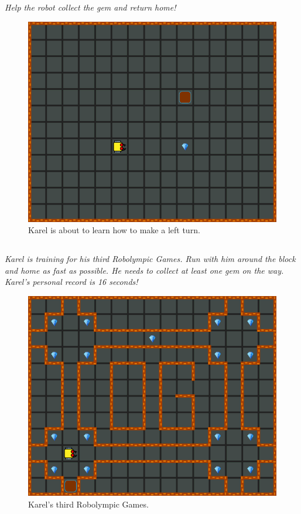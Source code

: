\documentclass[article,A4,12pt]{llncs}
\begin{document}
\subsection{}

{\em Help the robot collect the gem and return home!}

\begin{figure}[!ht]
\begin{center}
\includegraphics[height=0.4\textwidth]{imgk/a05.png}
\end{center}
\vspace{-4mm}
\caption{Karel is about to learn how to make a left turn.}
\label{fig:a05}
\vspace{-1cm}
\end{figure}
\noindent


\subsection{}

{\em Karel is training for his third Robolympic Games. Run with him around the block and home as fast as possible. He needs to collect at least one gem on the way. Karel's personal record is 16 seconds!}

\begin{figure}[!ht]
\begin{center}
\includegraphics[height=0.4\textwidth]{imgk/a06.png}
\end{center}
\vspace{-4mm}
\caption{Karel's third Robolympic Games.}
\label{fig:a06}
\vspace{-1cm}
\end{figure}
\noindent
\end{document}
